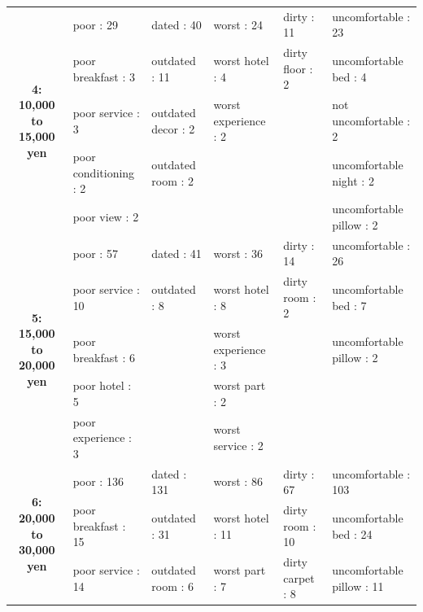 \documentclass[smallextended,natbib]{svjour3}       %
\begin{document}
\begin{landscape}
\begin{table}[p]
{\begin{tabular}{|c|l|l|l|l|l|}
           &
           &
           &
           &
           \\ \hline
        \multirow{5}{*}{\textbf{4: 10,000 to 15,000 yen}} &
          poor : 29 &
          dated : 40 &
          worst : 24 &
          dirty : 11 &
          uncomfortable : 23 \\
         &
          poor breakfast : 3 &
          outdated : 11 &
          worst hotel : 4 &
          dirty floor : 2 &
          uncomfortable bed : 4 \\
         &
          poor service : 3 &
          outdated decor : 2 &
          worst experience : 2 &
           &
          not uncomfortable : 2 \\
         &
          poor conditioning : 2 &
          outdated room : 2 &
           &
           &
          uncomfortable night : 2 \\
         &
          poor view : 2 &
           &
           &
           &
          uncomfortable pillow : 2 \\ \hline
        \multirow{5}{*}{\textbf{5: 15,000 to 20,000 yen}} &
          poor : 57 &
          dated : 41 &
          worst : 36 &
          dirty : 14 &
          uncomfortable : 26 \\
         &
          poor service : 10 &
          outdated : 8 &
          worst hotel : 8 &
          dirty room : 2 &
          uncomfortable bed : 7 \\
         &
          poor breakfast : 6 &
           &
          worst experience : 3 &
           &
          uncomfortable pillow : 2 \\
         &
          poor hotel : 5 &
           &
          worst part : 2 &
           &
           \\
         &
          poor experience : 3 &
           &
          worst service : 2 &
           &
           \\ \hline
        \multirow{5}{*}{\textbf{6: 20,000 to 30,000 yen}} &
          poor : 136 &
          dated : 131 &
          worst : 86 &
          dirty : 67 &
          uncomfortable : 103 \\
         &
          poor breakfast : 15 &
          outdated : 31 &
          worst hotel : 11 &
          dirty room : 10 &
          uncomfortable bed : 24 \\
         &
          poor service : 14 &
          outdated room : 6 &
          worst part : 7 &
          dirty carpet : 8 &
          uncomfortable pillow : 11 \\

\end{tabular}}
\end{table}
\end{landscape}
\end{document}
